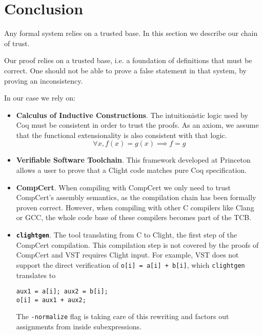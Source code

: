 \section{Conclusion}
\label{sec:Conclusion}

Any formal system relies on a trusted base. In this section we describe our
chain of trust.

Our proof relies on a trusted base, i.e. a foundation of definitions that must be
correct. One should not be able to prove a false statement in that system, \eg by
proving an inconsistency.

In our case we rely on:
\begin{itemize}
      \item \textbf{Calculus of Inductive Constructions}. The intuitionistic logic
            used by Coq must be consistent in order to trust the proofs. As an axiom,
            we assume that the functional extensionality is also consistent with that logic.
            $$\forall x, f(x) = g(x) \implies f = g$$

      \item \textbf{Verifiable Software Toolchain}. This framework developed at
            Princeton allows a user to prove that a Clight code matches pure Coq
            specification.

      \item \textbf{CompCert}. When compiling with CompCert we only need to trust
            CompCert's {assembly} semantics, as the compilation chain has been formally proven correct.
            However, when compiling with other C compilers like Clang or GCC, the
            whole code base of these compilers becomes part of the TCB.

      \item \textbf{\texttt{clightgen}}. The tool translating from {C} to
                  {Clight}, the first step of the CompCert compilation.
            This compilation step is not covered by the proofs of CompCert
            and VST requires Clight input. For example, VST does not support the direct verification of
            \texttt{o[i] = a[i] + b[i]}, which \texttt{clightgen} translates to
            \begin{lstlisting}[language=Ctweetnacl,stepnumber=0,belowskip=-0.5 \baselineskip]
aux1 = a[i]; aux2 = b[i];
o[i] = aux1 + aux2;
\end{lstlisting}
            The \texttt{-normalize} flag is taking care of this
            rewriting and factors out assignments from inside subexpressions.


\end{itemize}
